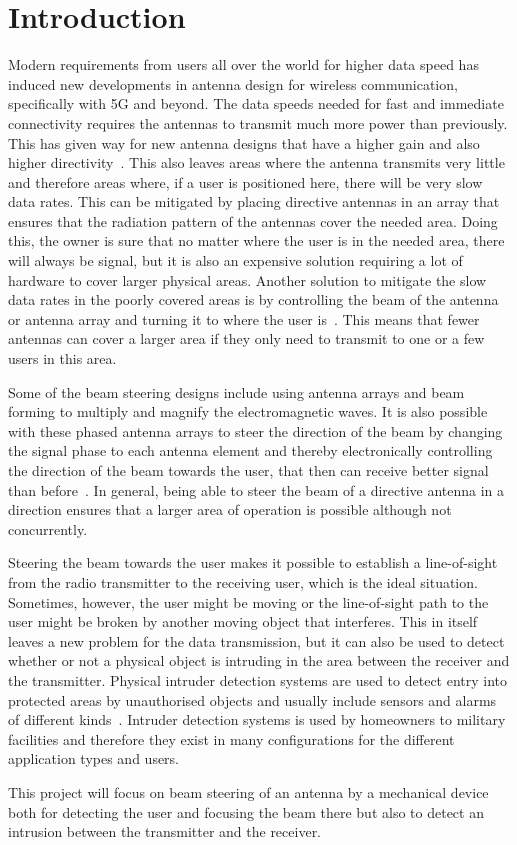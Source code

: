 \chapter{Introduction}
Modern requirements from users all over the world for higher data speed has induced new developments in antenna design for wireless communication, specifically with 5G and beyond. The data speeds needed for fast and immediate connectivity requires the antennas to transmit much more power than previously. This has given way for new antenna designs that have a higher gain and also higher directivity~\cite{beamsteering}. This also leaves areas where the antenna transmits very little and therefore areas where, if a user is positioned here, there will be very slow data rates. This can be mitigated by placing directive antennas in an array that ensures that the radiation pattern of the antennas cover the needed area. Doing this, the owner is sure that no matter where the user is in the needed area, there will always be signal, but it is also an expensive solution requiring a lot of hardware to cover larger physical areas. Another solution to mitigate the slow data rates in the poorly covered areas is by controlling the beam of the antenna or antenna array and turning it to where the user is~\cite{beamsteering}. This means that fewer antennas can cover a larger area if they only need to transmit to one or a few users in this area. 

Some of the beam steering designs include using antenna arrays and beam forming to multiply and magnify the electromagnetic waves. It is also possible with these phased antenna arrays to steer the direction of the beam by changing the signal phase to each antenna element and thereby electronically controlling the direction of the beam towards the user, that then can receive better signal than before~\cite{beamsteering}. In general, being able to steer the beam of a directive antenna in a direction ensures that a larger area of operation is possible although not concurrently.

Steering the beam towards the user makes it possible to establish a line-of-sight from the radio transmitter to the receiving user, which is the ideal situation. Sometimes, however, the user might be moving or the line-of-sight path to the user might be broken by another moving object that interferes. This in itself leaves a new problem for the data transmission, but it can also be used to detect whether or not a physical object is intruding in the area between the receiver and the transmitter. Physical intruder detection systems are used to detect entry into protected areas by unauthorised objects and usually include sensors and alarms of different kinds~\cite{ids}. Intruder detection systems is used by homeowners to military facilities and therefore they exist in many configurations for the different application types and users.

This project will focus on beam steering of an antenna by a mechanical device both for detecting the user and focusing the beam there but also to detect an intrusion between the transmitter and the receiver.